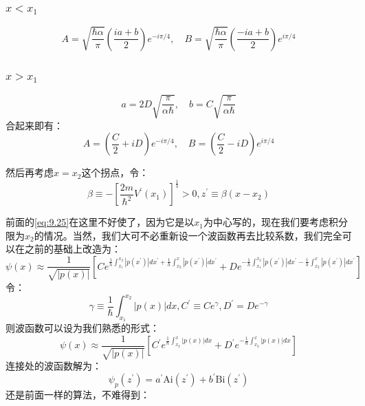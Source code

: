 \documentclass[a4paper,zihao=-4,linespread=1]{ctexrep}
\begin{document}
    \subsubsection*{$x<x_1$}
    \begin{equation}
        A=\sqrt{\frac{\hbar \alpha}{\pi}}\left(\frac{i a+b}{2}\right) e^{-i \pi / 4} , \quad B=\sqrt{\frac{\hbar \alpha}{\pi}}\left(\frac{-i a+b}{2}\right) e^{i \pi / 4}
    \end{equation}
    \subsubsection*{$x>x_1$}
    \begin{equation}
        a=2 D \sqrt{\frac{\pi}{\alpha \hbar}}, \quad b=C \sqrt{\frac{\pi}{\alpha \hbar}}
    \end{equation}
    合起来即有：
    \begin{equation}
        A=\left(\frac{C}{2}+i D\right) e^{-i \pi / 4} , \quad B=\left(\frac{C}{2}-i D\right) e^{i \pi / 4}
    \end{equation}

    然后再考虑$x=x_2$这个拐点，令：
    \[\beta\equiv-\left[\frac{2m}{\hbar^2}V^\prime(x_1)\right]^{\frac{1}{3}}>0,z^\prime\equiv\beta(x-x_2)\]

    前面的\ref{eq:9.25}在这里不好使了，因为它是以$x_1$为中心写的，现在我们要考虑积分限为$x_2$的情况。当然，我们大可不必重新设一个波函数再去比较系数，我们完全可以在之前的基础上改造为：
    \begin{equation}
        \psi(x)\approx\frac{1}{\sqrt{|p(x)|}}\left[C e^{\frac{1}{h} \int_{x_1}^{x_2}\left|p\left(x^{\prime}\right)\right| d x^{\prime}+\frac{1}{h} \int_{x_2}^x\left|p\left(x^{\prime}\right)\right| d x^{\prime}}+D e^{-\frac{1}{h} \int_{x_1}^{x_2}\left|p\left(x^{\prime}\right)\right| d x^{\prime}-\frac{1}{h} \int_{x_2}^x\left|p\left(x^{\prime}\right)\right| d x^{\prime}}\right]
    \end{equation}
    令：
    \[\gamma\equiv\frac{1}{\hbar}\int_{x_1}^{x_2}|p(x)|dx,C^\prime\equiv Ce^\gamma,D^\prime=De^{-\gamma}\]
    则波函数可以设为我们熟悉的形式：
    \begin{equation}
        \psi(x)\approx\frac{1}{\sqrt{|p(x)|}}\left[C^\prime e^{\frac{1}{\hbar}\int_{x_2}^{x}|p(x)|dx}+D^\prime e^{-\frac{1}{\hbar}\int_{x_2}^{x}|p(x)|dx}\right]
    \end{equation}
    连接处的波函数解为：
    \[\psi_p(z^\prime)=a^\prime\mathrm{Ai}(z^\prime)+b^\prime\mathrm{Bi}(z^\prime)\]
    还是前面一样的算法，不难得到：
\end{document}
